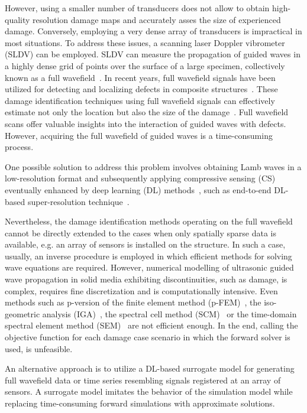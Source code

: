 \documentclass[sn-mathphys-num]{sn-jnl}%
\begin{document}
	However, using a smaller number of transducers does not allow to obtain 
	high-quality resolution damage maps and accurately asses the size of 
	experienced damage. 
	Conversely, employing a very dense array of transducers is impractical in 
	most situations. 
	To address these issues, a scanning laser Doppler vibrometer (SLDV) 
	can be employed. 
	SLDV can measure the propagation of guided waves in a highly dense grid of 
	points over the surface of a large specimen, collectively known as a full 
	wavefield~\cite{Radzienski2019a}. 
	In recent years, full wavefield signals have been utilized for detecting 
	and localizing defects in composite structures~\cite{Radzienski2019a, 
	Girolamo2018a, kudela2018impact, rogge2013characterization}. 
	These damage identification techniques using full wavefield signals can 
	effectively estimate not only the location but also the size of the 
	damage~\cite{Girolamo2018a, kudela2018impact}. 
	Full wavefield scans offer valuable insights into the interaction of guided 
	waves with defects. However, acquiring the full wavefield of guided waves 
	is a time-consuming process.
	
	One possible solution to address this problem involves obtaining Lamb waves 
	in a low-resolution format and subsequently applying compressive sensing 
	(CS) eventually enhanced by deep learning (DL) 
	methods~\cite{esfandabadideep}, such as end-to-end DL-based 
	super-resolution technique~\cite{ijjeh2023deep}. 
	
	Nevertheless, the damage identification methods operating on the full 
	wavefield cannot be directly extended to the cases when only spatially 
	sparse data is available, e.g. an array of sensors is installed on the 
	structure.
	In such a case, usually, an inverse procedure is employed in which 
	efficient methods for solving wave equations are required.  
	However, numerical modelling of ultrasonic guided wave propagation in solid 
	media exhibiting discontinuities, such as damage, is complex, requires fine 
	discretization and is computationally intensive.
	Even methods such as p-version of the finite element method 
	(p-FEM)~\cite{Duczek2013}, the iso-geometric analysis 
	(IGA)~\cite{Anitescu2019}, the spectral cell method 
	(SCM)~\cite{Mossaiby2019} or the time-domain spectral element method 
	(SEM)~\cite{Ostachowicz2012} are not efficient enough.
	In the end, calling the objective function for each damage case scenario in 
	which the forward solver is used, is unfeasible.
	
	An alternative approach is to utilize a DL-based surrogate model for 
	generating full wavefield data or time series resembling signals registered 
	at an array of sensors. 
	A surrogate model imitates the behavior of the simulation model while 
	replacing time-consuming forward simulations with approximate solutions.
	
\end{document}
